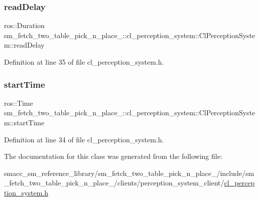\subsubsection{\texorpdfstring{read\+Delay}{readDelay}}
{\footnotesize\ttfamily ros\+::\+Duration sm\+\_\+fetch\+\_\+two\+\_\+table\+\_\+pick\+\_\+n\+\_\+place\+\_\+::cl\+\_\+perception\+\_\+system\+::\+Cl\+Perception\+System\+::read\+Delay}



Definition at line 35 of file cl\+\_\+perception\+\_\+system.\+h.

\mbox{\label{classsm__fetch__two__table__pick__n__place__1_1_1cl__perception__system_1_1ClPerceptionSystem_a3b88edd8d62e132052c3f0908839dbb1}} 
\subsubsection{\texorpdfstring{start\+Time}{startTime}}
{\footnotesize\ttfamily ros\+::\+Time sm\+\_\+fetch\+\_\+two\+\_\+table\+\_\+pick\+\_\+n\+\_\+place\+\_\+::cl\+\_\+perception\+\_\+system\+::\+Cl\+Perception\+System\+::start\+Time}



Definition at line 34 of file cl\+\_\+perception\+\_\+system.\+h.



The documentation for this class was generated from the following file\+:\begin{DoxyCompactItemize}
\item 
smacc\+\_\+sm\+\_\+reference\+\_\+library/sm\+\_\+fetch\+\_\+two\+\_\+table\+\_\+pick\+\_\+n\+\_\+place\+\_/include/sm\+\_\+fetch\+\_\+two\+\_\+table\+\_\+pick\+\_\+n\+\_\+place\+\_/clients/perception\+\_\+system\+\_\+client/\hyperlink{sm__fetch__two__table__pick__n__place__1_2include_2sm__fetch__two__table__pick__n__place__1_2cli5d984beeae40655699a21da4da1896c8}{cl\+\_\+perception\+\_\+system.\+h}\end{DoxyCompactItemize}

